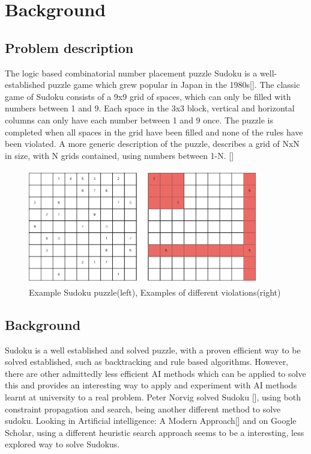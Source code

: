 \documentclass[a4paper,11pt]{article}
\begin{document}
\section{Background}

\subsection{Problem description}
The logic based combinatorial number placement puzzle Sudoku is a well-established puzzle game which grew popular in Japan in the 1980s[]. The classic game of Sudoku consists of a 9x9 grid of spaces, which can only be filled with numbers between 1 and 9. Each space in the 3x3 block, vertical and horizontal columns can only have each number between 1 and 9 once. The puzzle is completed when all spaces in the grid have been filled and none of the rules have been violated. A more generic description of the puzzle, describes a grid of NxN in size, with N grids contained, using numbers between 1-N. []
\begin{figure}[h]
	\caption{Example Sudoku puzzle(left), Examples of different violations(right)}
	\centering
	\includegraphics[height=5cm, width=10cm]{./Diagrams/violationExample}
\end{figure}

\subsection{Background}
Sudoku is a well established and solved puzzle, with a proven efficient way to be solved established, such as backtracking and rule based algorithms. However, there are other admittedly less efficient AI methods which can be applied to solve this and provides an interesting way to apply and experiment with AI methods learnt at university to a real problem. Peter Norvig solved Sudoku [], using both constraint propagation and search, being another different method to solve sudoku. Looking in Artificial intelligence: A Modern Approach[] and on Google Scholar, using a different heuristic search approach seems to be a interesting, less explored way to solve Sudokus. \newline \newline
\end{document}
